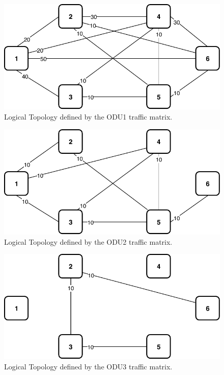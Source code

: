 \begin{figure}[h!]
\centering
\includegraphics[width=12cm]{sdf/ilp/opaque_survivability/figures/logical_topology_ODU1_medium}
\caption{Logical Topology defined by the ODU1 traffic matrix.}
\label{logical_ODU1_medium}
\end{figure}

\begin{figure}[h!]
\centering
\includegraphics[width=12cm]{sdf/ilp/opaque_survivability/figures/logical_topology_ODU2_medium}
\caption{Logical Topology defined by the ODU2 traffic matrix.}
\label{logical_ODU2_medium}
\end{figure}

\begin{figure}[h!]
\centering
\includegraphics[width=12cm]{sdf/ilp/opaque_survivability/figures/logical_topology_ODU3_medium}
\caption{Logical Topology defined by the ODU3 traffic matrix.}
\label{logical_ODU3_medium}
\end{figure}

